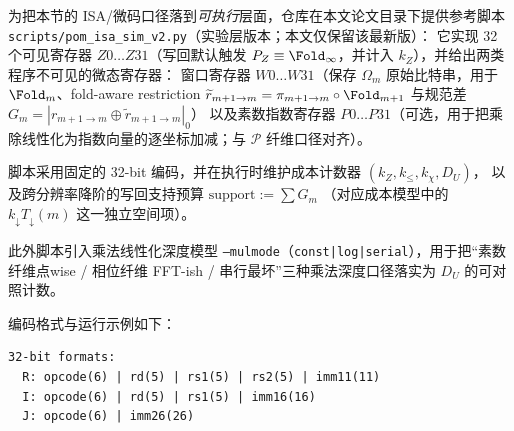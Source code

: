 \begin{remark}\label{rem:pom-isa-sim}
为把本节的 ISA/微码口径落到\emph{可执行}层面，仓库在本文论文目录下提供参考脚本
\texttt{scripts/pom\_isa\_sim\_v2.py}（实验层版本；本文仅保留该最新版）：
它实现 32 个可见寄存器 $Z0\ldots Z31$（写回默认触发 $P_Z\equiv\Fold_\infty$，并计入 $k_Z$），并给出两类程序不可见的微态寄存器：
窗口寄存器 $W0\ldots W31$（保存 $\Omega_m$ 原始比特串，用于 $\Fold_m$、fold-aware restriction
\(\widetilde r_{m+1\to m}=\pi_{m+1\to m}\circ \Fold_{m+1}\)
与规范差 \(G_m=|r_{m+1\to m}\oplus \widetilde r_{m+1\to m}|_0\)）
以及素数指数寄存器 $P0\ldots P31$（可选，用于把乘除线性化为指数向量的逐坐标加减；与 \(\mathcal P\) 纤维口径对齐）。
\par
脚本采用固定的 32-bit 编码，并在执行时维护成本计数器
\((k_Z,k_{\le},k_\chi,D_U)\)，
以及跨分辨率降阶的写回支持预算
\(\mathrm{support}:=\sum G_m\)
（对应成本模型中的 \(k_{\downarrow}T_{\downarrow}(m)\) 这一独立空间项）。
\par
此外脚本引入乘法线性化深度模型 \texttt{--mulmode}（\texttt{const|log|serial}），用于把“素数纤维点wise / 相位纤维 FFT-ish / 串行最坏”三种乘法深度口径落实为 \(D_U\) 的可对照计数。
\par
编码格式与运行示例如下：
\begin{verbatim}
32-bit formats:
  R: opcode(6) | rd(5) | rs1(5) | rs2(5) | imm11(11)
  I: opcode(6) | rd(5) | rs1(5) | imm16(16)
  J: opcode(6) | imm26(26)


\end{verbatim}
\end{remark}
